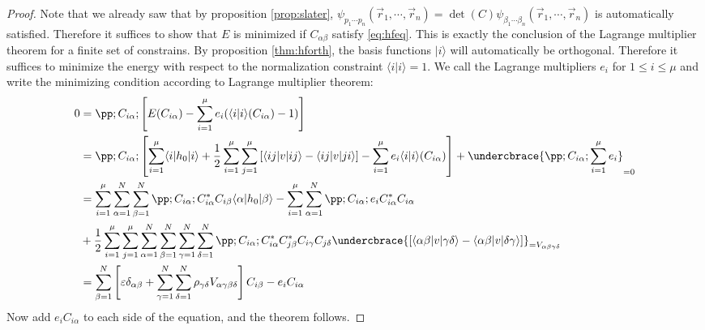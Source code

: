 \documentclass[11pt,english,a4paper]{article}
\begin{document}
\begin{proof}
Note that we already saw that by proposition \ref{prop:slater}, $\psi_{  p_1\cdots p_n}(\vec{r}_1,\cdots, \vec{r}_n) = \det (C) \psi_{  \beta_1\cdots \beta_n}(\vec{r}_1,\cdots, \vec{r}_n)$ is automatically satisfied. Therefore it suffices to show that $E$ is minimized if $C_{  \alpha \beta}$ satisfy \eqref{eq:hfeq}. This is exactly the conclusion of the Lagrange multiplier theorem for a finite set of constrains. By proposition \ref{thm:hforth}, the basis functions $ |  i \rangle$ will automatically be orthogonal. Therefore it suffices to minimize the energy with respect to the normalization constraint $\langle i|i \rangle = 1$. We call the Lagrange multipliers $e_i$ for $1 \leq i \leq \mu$ and write the minimizing condition according to Lagrange multiplier theorem:
\begin{align*}
0 &= \pp ;C_{  i \alpha}; \left[ E(C_{  i \alpha}) - \sum_{i=1}^\mu e_i(\langle i|i \rangle(C_{  i \alpha}) - 1) \right] \\
&= \pp ;C_{  i \alpha}; \left[ 
\sum_{i=1}^\mu \langle i | h_0 | i \rangle + \frac{1}{2} \sum_{i=1}^\mu \sum_{j=1}^\mu \left[ \langle ij|v|ij \rangle - \langle ij|v|ji \rangle \right]
- \sum_{i=1}^\mu e_i\langle i|i \rangle(C_{  i \alpha} )
\right] + \undercbrace{\pp ;C_{  i \alpha}; \sum_{i=1}^\mu e_i}_{  =0}\\
&=  
\sum_{i=1}^\mu \sum_{\alpha=1}^N \sum_{\beta=1}^N\pp ;C_{  i \alpha}; C^*_{  i\alpha} C_{  i \beta} \langle \alpha | h_0 | \beta \rangle - \sum_{i=1}^\mu\sum_{\alpha=1}^N \pp ;C_{  i \alpha};e_iC^*_{  i\alpha} C_{  i \alpha}\\
&+ \frac{1}{2} \sum_{i=1}^\mu \sum_{j=1}^\mu \sum_{\alpha=1}^N\sum_{\beta=1}^N\sum_{\gamma=1}^N\sum_{\delta=1}^N\pp ;C_{  i \alpha}; C^*_{  i\alpha} C_{  j \beta}^*C_{  i\gamma} C_{  j \delta} \undercbrace{\left[ \langle \alpha \beta|v|\gamma \delta \rangle - \langle \alpha \beta|v|\delta \gamma \rangle \right]}_{=V_{  \alpha \beta \gamma \delta}} \\
&= \sum_{\beta=1}^N \left[ \varepsilon \delta_{  \alpha \beta} + \sum_{\gamma = 1}^N \sum_{\delta=1}^N \rho_{  \gamma \delta} V_{  \alpha \gamma \beta \delta} \right] C_{  i \beta} - e_i C_{  i \alpha}
\end{align*}
Now add $e_i C_{  i \alpha}$ to each side of the equation, and the theorem follows.
\end{proof}
\end{document}
